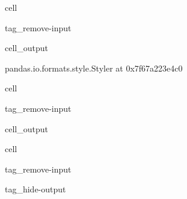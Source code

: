 \documentclass[letterpaper,10pt,english]{jupyterBook}
\begin{document}
\begin{sphinxuseclass}{cell}
\begin{sphinxuseclass}{tag_remove-input}\begin{sphinxVerbatimOutput}

\begin{sphinxuseclass}{cell_output}
\begin{sphinxVerbatim}[commandchars=\\\{\}]
\PYGZlt{}pandas.io.formats.style.Styler at 0x7f67a223e4c0\PYGZgt{}
\end{sphinxVerbatim}

\end{sphinxuseclass}\end{sphinxVerbatimOutput}

\end{sphinxuseclass}
\end{sphinxuseclass}
\begin{sphinxuseclass}{cell}
\begin{sphinxuseclass}{tag_remove-input}\begin{sphinxVerbatimOutput}

\begin{sphinxuseclass}{cell_output}
\end{sphinxuseclass}\end{sphinxVerbatimOutput}

\end{sphinxuseclass}
\end{sphinxuseclass}
\begin{sphinxuseclass}{cell}
\begin{sphinxuseclass}{tag_remove-input}
\begin{sphinxuseclass}{tag_hide-output}
\end{sphinxuseclass}
\end{sphinxuseclass}
\end{sphinxuseclass}






\renewcommand{\indexname}{Index}
\printindex
\end{document}
